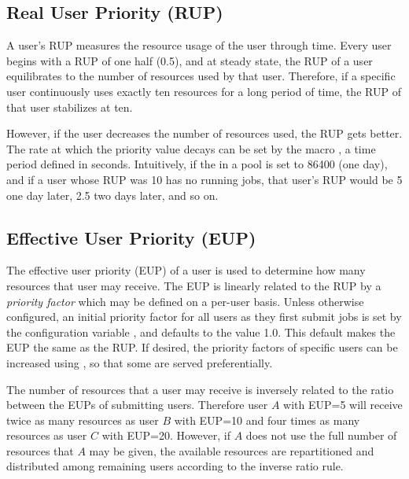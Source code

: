 \subsection{\label{sec:RUP}Real User Priority (RUP)}
A user's RUP measures the resource usage of the user 
through time.
Every user begins with a RUP of one half (0.5), and
at steady state, the RUP of a user equilibrates to the number of resources 
used by that user.  Therefore, if a specific user continuously uses exactly 
ten resources for a long period of time, the RUP of that user stabilizes at 
ten.

However, if the user decreases the number of resources used, the RUP
gets better.  The rate at which the priority value decays 
can be set by the macro , a time period 
defined in seconds.   Intuitively, if the  in a pool 
is set to 86400 (one day), and if a user whose RUP was 10 has no
running jobs, 
that user's RUP would be 5 one day later, 2.5 two days later,
and so on.

\subsection{\label{sec:EUP}Effective User Priority (EUP)}
The effective user priority (EUP) of a user is used to determine
how many resources that user may receive.
The EUP is linearly related to the RUP
by a \emph{priority factor} which may be defined on a per-user basis.
Unless otherwise configured, 
an initial priority factor for all users as they first submit jobs
is set by the configuration variable ,
and defaults to the value 1.0.
This default makes the EUP the same as the RUP.
If desired, the priority factors of
specific users can be increased using ,
so that some are served preferentially.

The number of resources that a user may receive is inversely related
to the ratio between the EUPs of submitting users.
Therefore user $A$ with EUP=5 will receive
twice as many resources as user $B$ with EUP=10 and four times as many 
resources as user $C$ with EUP=20.
However, if $A$ does not use the full number
of resources that $A$ may be given,
the available resources are repartitioned and distributed among
remaining users according to the inverse ratio rule.

